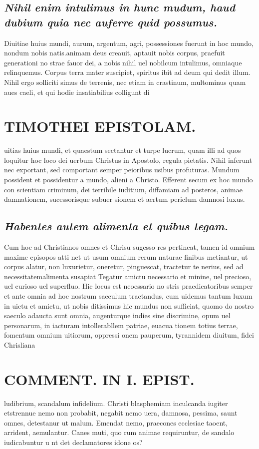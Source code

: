 \documentclass{article}
\begin{document}
\begin{pages}
\subsection*{\textit{Nihil enim intulimus in hunc mudum, haud dubium quia nec auferre quid possumus. }}\pstart Diuitiae huius mundi, aurum, argentum, agri, possessiones fuerunt in hoc mundo, nondum nobis natis.animam deus creauit, aptauit nobis corpus, praefuit generationi no strae fauor dei, a nobis nihil uel nobilcum intulimus, omniaque relinquemus. Corpus terra mater suscipiet, spiritus ibit ad deum qui dedit illum. Nihil ergo solliciti simus de terrenis, nec etiam in crastinum, multominus quam aues caeli, et qui hodie insatiabilius colligunt di  \pend
\section*{TIMOTHEI EPISTOLAM. }
\marginpar{[ p.163 ]}\pstart uitias huius mundi, et quaestum sectantur et turpe lucrum, quam illi ad quos loquitur hoc loco dei uerbum Christus in Apostolo, regula pietatis. Nihil inferunt nec exportant, sed comportant semper peioribus usibus profuturas. Mundum possident et possidentur a mundo, alieni a Christo. Efferent secum ex hoc mundo con scientiam criminum, dei terribile iuditium, diffamiam ad posteros, animae damnationem, sucessorisque subuer sionem et aertum periclum damnosi luxus.  \pend
{}
{}
\subsection*{\textit{Habentes autem alimenta et quibus tegam. }}\pstart Cum hoc ad Christianos omnes et Chrisu sugesso res pertineat, tamen id omnium maxime episopos atti net ut usum omnium rerum naturae finibus metiantur, ut corpus alatur, non luxurietur, oneretur, pinguescat, tractetur te nerius, sed ad necessitatemalimenta susapiat Tegatur amictu necessario et minine, uel precioso, uel curioso uel superfluo. Hic locus est neoessario no stris praedicatoribus semper et ante omnia ad hoc nostrum saeculum tractandus, cum uidemus tantum luxum in uictu et amictu, ut nobis ditissimus hic mundus non sufficiat, quomo do nostro saeculo adaucta sunt omnia, augenturque indies sine discrimine, opum uel personarum, in iacturam intollerabllem patriae, euacua tionem totius terrae, fomentum omnium uitiorum, oppressi onem pauperum, tyrannidem diuitum, fidei Chrisliana  \pend
\section*{COMMENT. IN I. EPIST. }
\marginpar{[ p.164 ]}\pstart ludibrium, scandalum infidelium. Christi blasphemiam inculcanda iugiter etstrennue nemo non probabit, negabit nemo uera, damnosa, pessima, saunt omnes, detestanur ut malum. Emendat nemo, praecones ecclesiae taoent, arrident, aemulantur. Canes muti, quo rum animae requiruntur, de sandalo iudicabuntur u nt det declamatores idone os?  \pend
{}
{}

\end{pages}
\end{document}
